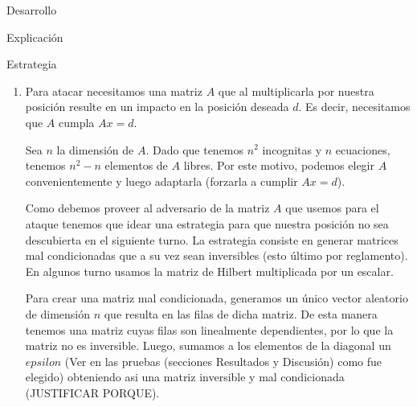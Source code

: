 \begin{section}{Desarrollo}
\begin{subsection}{Explicación}
\begin{subsubsection}{Estrategia}
\begin{enumerate}
\begin{itemize}
					Elegimos este método ya que las matrices son cuadradas y la implementación es sencilla.\\
					PONER MAS MOTIVOS COMO COMPLEJIDAD!!!!!!!!!!!!!!!!!!!!!!!!!!!!!!!!!!!!!!!!!!!!!!!!!!!!\\
				\end{itemize}
			
				La exactitud con la que calculemos la posición buscada $y$ depende del número de condición de la matriz $A'$, cuanto mayor es este número menor es la precisión del resultado obtenido. Se considera que alcanzamos al rival cuando $\left|| y' - y \right|| \leq 1$, donde $y'$ es la solución encontrada.
				
				Como creemos que el adversario va a utilizar matrices mal condicionadas para atacarnos, en cada turno estariamos calculando una posición errada de donde se encuentra. Por este motivo, decidimos usar la estrategia de disparar en el punto promedio de todos las posiciones calculadas hasta el momento de donde se situa. Esperamos de esta manera ir obteniendo cada vez mejores aproximaciones a donde se encuentra realmente.
			
			
			\item Para atacar necesitamos una matriz $A$ que al multiplicarla por nuestra posición resulte en un impacto en la posición deseada $d$. Es decir, necesitamos que $A$ cumpla $Ax=d$.
			
			Sea $n$ la dimensión de $A$.
			Dado que tenemos $n^2$ incognitas y $n$ ecuaciones, tenemos $n^2-n$ elementos de $A$ libres. Por este motivo, podemos elegir $A$ convenientemente y luego adaptarla (forzarla a cumplir $Ax=d$).			
			
			Como debemos proveer al adversario de la matriz $A$ que usemos para el ataque tenemos que idear una estrategia para que nuestra posición no sea descubierta en el siguiente turno. La estrategia consiste en generar matrices mal condicionadas que a su vez sean inversibles (esto último por reglamento). En algunos turno usamos la matriz de Hilbert multiplicada por un escalar. 
			
			Para crear una matriz mal condicionada, generamos un único vector aleatorio de dimensión $n$ que resulta en las filas de dicha matriz. De esta manera tenemos una matriz cuyas filas son linealmente dependientes, por lo que la matriz no es inversible. Luego, sumamos a los elementos de la diagonal un $epsilon$ (Ver en las pruebas (secciones Resultados y Discusión) como fue elegido) obteniendo asi una matriz inversible y mal condicionada (JUSTIFICAR PORQUE).
			

\end{enumerate}
\end{subsubsection}
\end{subsection}
\end{section}
